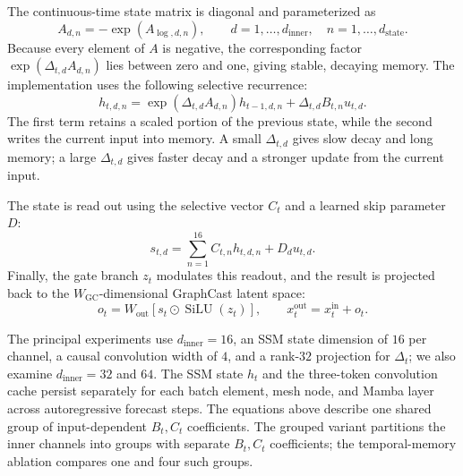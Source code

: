 \documentclass{article}
\begin{document}
The continuous-time state matrix is diagonal and parameterized as
\begin{equation}
    A_{d,n}=-\exp(A_{\log,d,n}),
    \qquad
    d=1,\ldots,d_{\textrm{inner}},\quad n=1,\ldots,d_{\textrm{state}}.
\end{equation}
Because every element of $A$ is negative, the corresponding factor $\exp(\Delta_{t,d}A_{d,n})$ lies between zero and one, giving stable, decaying memory. The implementation uses the following selective recurrence:
\begin{equation}
    h_{t,d,n}
    =
    \exp\!\left(\Delta_{t,d}A_{d,n}\right)h_{t-1,d,n}
    +
    \Delta_{t,d}B_{t,n}u_{t,d}.
\end{equation}
The first term retains a scaled portion of the previous state, while the second writes the current input into memory. A small $\Delta_{t,d}$ gives slow decay and long memory; a large $\Delta_{t,d}$ gives faster decay and a stronger update from the current input.

The state is read out using the selective vector $C_t$ and a learned skip parameter $D$:
\begin{equation}
    s_{t,d}
    =
    \sum_{n=1}^{16} C_{t,n}h_{t,d,n}
    +
    D_d u_{t,d}.
\end{equation}
Finally, the gate branch $z_t$ modulates this readout, and the result is projected back to the $W_{\textrm{GC}}$-dimensional GraphCast latent space:
\begin{equation}
    o_t
    =
    W_{\mathrm{out}}
    \left[
        s_t\odot\operatorname{SiLU}(z_t)
    \right],
    \qquad
    x_t^{\mathrm{out}}=x_t^{\mathrm{in}}+o_t.
\end{equation}

The principal experiments use $d_{\mathrm{inner}}=16$, an SSM state dimension of $16$ per channel, a causal convolution width of $4$, and a rank-$32$ projection for $\Delta_t$; we also examine $d_{\mathrm{inner}}=32$ and $64$. The SSM state $h_t$ and the three-token convolution cache persist separately for each batch element, mesh node, and Mamba layer across autoregressive forecast steps. The equations above describe one shared group of input-dependent $B_t,C_t$ coefficients. The grouped variant partitions the inner channels into groups with separate $B_t,C_t$ coefficients; the temporal-memory ablation compares one and four such groups.
\end{document}
